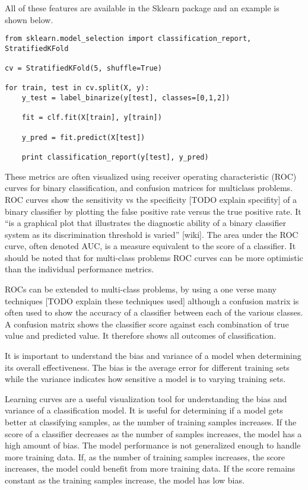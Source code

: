 All of these features are available in the Sklearn package and an example is shown below.
%
\begin{lstlisting}
from sklearn.model_selection import classification_report, StratifiedKFold

cv = StratifiedKFold(5, shuffle=True)

for train, test in cv.split(X, y):
    y_test = label_binarize(y[test], classes=[0,1,2])

    fit = clf.fit(X[train], y[train])

    y_pred = fit.predict(X[test])

    print classification_report(y[test], y_pred)
\end{lstlisting}
%
These metrics are often visualized using receiver operating characteristic (ROC) curves for binary classification, and confusion matrices for multiclass problems.  ROC curves show the sensitivity vs the specificity [TODO explain specifity] of a binary classifier by plotting the false positive rate versus the true positive rate.  It “is a graphical plot that illustrates the diagnostic ability of a binary classifier system as its discrimination threshold is varied” [wiki]. The area under the ROC curve, often denoted AUC, is a measure equivalent to the score of a classifier. It should be noted that for multi-class problems ROC curves can be more optimistic than the individual performance metrics.

ROCs can be extended to multi-class problems, by using a one verse many techniques [TODO explain these techniques used] although a confusion matrix is often used to show the accuracy of a classifier between each of the various classes.  A confusion matrix shows the classifier score against each combination of true value and predicted value.  It therefore shows all outcomes of classification.

It is important to understand the bias and variance of a model when determining its overall effectiveness.  The bias is the average error for different training sets while the variance indicates how sensitive a model is to varying training sets.

Learning curves are a useful visualization tool for understanding the bias and variance of a classification model.  It is useful for determining if a model gets better at classifying samples, as the number of training samples increases.  If the score of a classifier decreases as the number of samples increases, the model has a high amount of bias.  The model performance is not generalized enough to handle more training data.  If, as the number of training samples increases, the score increases, the model could benefit from more training data.  If the score remains constant as the training samples increase, the model has low bias.

